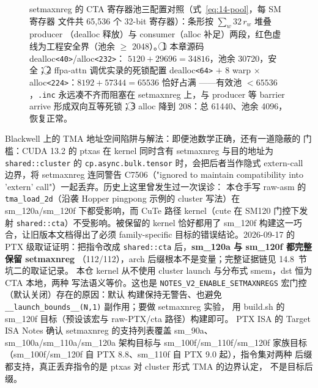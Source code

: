 \begin{figure}[H]
\caption{setmaxnreg 的 CTA 寄存器池三配置对照（式~\ref{eq:14-pool}，每 SM 寄存器
文件共 65{,}536 个 32-bit 寄存器）：条形按 $\sum_w 32\,r_w$ 堆叠 producer
（dealloc 释放）与 consumer（alloc 补足）两段，红色虚线为工程安全界（池余
$\ge$ 2048）。\textcircled{1} 本章源码 dealloc\texttt{<40>}/alloc\texttt{<232>}：
$5120+29696=34816$，池余 30720，安全；\textcircled{2} ffpa-attn 调优实录的死锁配置
dealloc\texttt{<64>} $+$ 8 warp $\times$ alloc\texttt{<224>}：$8192+57344=65536$ 恰好占满
——有效池 $<65536$，\texttt{.inc} 永远凑不齐而阻塞在 setmaxnreg 上，与 producer 等
barrier arrive 形成双向互等死锁；\textcircled{3} alloc 降到 208：总 61440、池余
4096，恢复正常。}
\label{fig:14-regpool}
\end{figure}

Blackwell 上的 TMA 地址空间陷阱与解法：即便池数学正确，还有一道隐蔽的
门槛：CUDA 13.2 的 ptxas 在 kernel 同时含有 setmaxnreg 与目的地址为
\texttt{shared::cluster} 的 \texttt{cp.\allowbreak{}async.\allowbreak{}bulk.\allowbreak{}tensor} 时，会把后者当作隐式
extern-call 边界，将 setmaxnreg 连同警告 C7506（"ignored to maintain
compatibility into 'extern' call"）一起丢弃。历史上这里曾发生过一次误诊：
本仓手写 raw-asm 的 \texttt{tma\_\allowbreak{}load\_\allowbreak{}2d}（沿袭 Hopper
pingpong 示例的 cluster 写法）在 sm\_120a/sm\_120f 下都受影响，而 CuTe 路径
kernel（cute 在 SM120 门控下发射 \texttt{shared::cta}）不受影响。被保留的 kernel
恰好都用了 sm\_120f 构建这一巧合，让旧版本文档得出了必须 family-specific
目标的错误结论。2026-09-17 的 PTX 级取证证明：把指令改成
\texttt{shared::cta} 后，\textbf{sm\_120a 与 sm\_120f 都完整保留 setmaxnreg}
（112/112），arch 后缀根本不是变量；完整证据链见 14.8~节坑二的取证记录。
本仓 kernel 从不使用 cluster launch 与分布式 smem，dst 恒为 CTA 本地，两种
写法语义等价。这也是
\texttt{NOTES\_\allowbreak{}V2\_\allowbreak{}ENABLE\_\allowbreak{}SETMAXNREGS} 宏门控（默认关闭）存在的原因：默认
构建保持无警告、也避免
\texttt{\_\allowbreak{}\_\allowbreak{}launch\_\allowbreak{}bounds\_\allowbreak{}\_\allowbreak{}(N,\allowbreak{}1)} 副作用；要做 setmaxnreg 实验，
用 build.sh 的 sm\_120f 目标（预设该宏与 raw-PTX/cta 路径）构建即可。
PTX ISA 的 Target ISA Notes 确认 setmaxnreg 的支持列表覆盖 sm\_90a、
sm\_100a/sm\_110a/sm\_120a 架构目标与 sm\_100f/sm\_110f/sm\_120f 家族目标
（sm\_100f/sm\_120f 自 PTX 8.8、sm\_110f 自 PTX 9.0 起），指令集对两种
后缀都支持，真正丢弃指令的是 ptxas 对 cluster 形式 TMA 的边界认定，
不是目标后缀。

